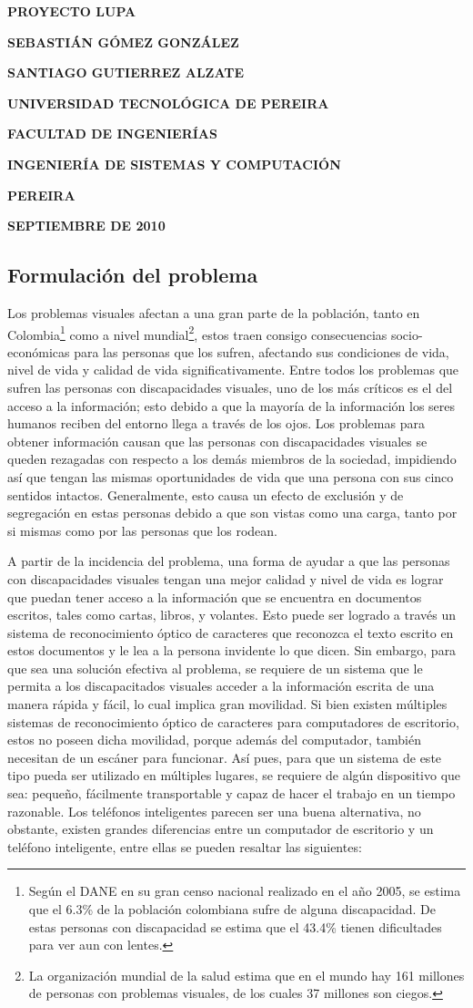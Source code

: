 \documentclass[a4paper, 12pt, oneside]{article}
\newcommand\portada{
	\begin{titlepage}
		\begin{center}
			{\large \bf PROYECTO LUPA }
			\vfill
			{\large\bf SEBASTIÁN GÓMEZ GONZÁLEZ \par}
			{\large\bf SANTIAGO GUTIERREZ ALZATE \par}
			\vfill
			{\large\bf UNIVERSIDAD TECNOLÓGICA DE PEREIRA  \par}
			{\large\bf FACULTAD DE INGENIERÍAS \par}
			{\large\bf INGENIERÍA DE SISTEMAS Y COMPUTACIÓN \par}
			{\large\bf PEREIRA\par}
			{\large\bf SEPTIEMBRE DE 2010 \par}
		\end{center}
	\end{titlepage}
}
\begin{document}
\portada

	\tableofcontents
	\clearpage
	
	\begin{center}
	\section{Formulación del problema}
	\end{center}

	Los problemas visuales afectan a una gran parte de la población, tanto en Colombia\footnote{Según el DANE en su gran censo nacional realizado en el año 2005, se estima que el 6.3\% de la población colombiana sufre de alguna discapacidad. De estas personas con discapacidad se estima que el 43.4\% tienen dificultades para ver aun con lentes.} como a nivel mundial\footnote{La organización mundial de la salud estima que en el mundo hay 161 millones de personas con problemas visuales, de los cuales 37 millones son ciegos.}, estos traen consigo consecuencias socio-económicas para las personas que los sufren, afectando sus condiciones de vida, nivel de vida y calidad de vida significativamente. Entre todos los problemas que sufren las personas con discapacidades visuales, uno de los más críticos es el del acceso a la información; esto debido a que la mayoría de la información los seres humanos reciben del entorno llega a través de los ojos. Los problemas para obtener información causan que las personas con discapacidades visuales se queden rezagadas con respecto a los demás miembros de la sociedad, impidiendo así que tengan las mismas oportunidades de vida que una persona con sus cinco sentidos intactos. Generalmente, esto causa un efecto de exclusión y de segregación en estas personas debido a que son vistas como una carga, tanto por si mismas como por las personas que los rodean. 

	A partir de la incidencia del problema, una forma de ayudar a que las personas con discapacidades visuales tengan una mejor calidad y nivel de vida es lograr que puedan tener acceso a la información que se encuentra en documentos escritos, tales como cartas, libros, y volantes. Esto puede ser logrado a través un sistema de reconocimiento óptico de caracteres que reconozca el texto escrito en estos documentos y le lea a la persona invidente lo que dicen. Sin embargo, para que sea una solución efectiva al problema, se requiere de un sistema que le permita a los discapacitados visuales acceder a la información escrita de una manera rápida y fácil, lo cual implica gran movilidad. Si bien existen múltiples sistemas de reconocimiento óptico de caracteres para computadores de escritorio, estos no poseen dicha movilidad, porque además del computador, también necesitan de un escáner para funcionar. Así pues, para que un sistema de este tipo pueda ser utilizado en múltiples lugares, se requiere de algún dispositivo que sea: pequeño, fácilmente transportable y capaz de hacer el trabajo en un tiempo razonable. Los teléfonos inteligentes parecen ser una buena alternativa, no obstante, existen grandes diferencias entre un computador de escritorio y un teléfono inteligente, entre ellas se pueden resaltar las siguientes:
	
\end{document}
